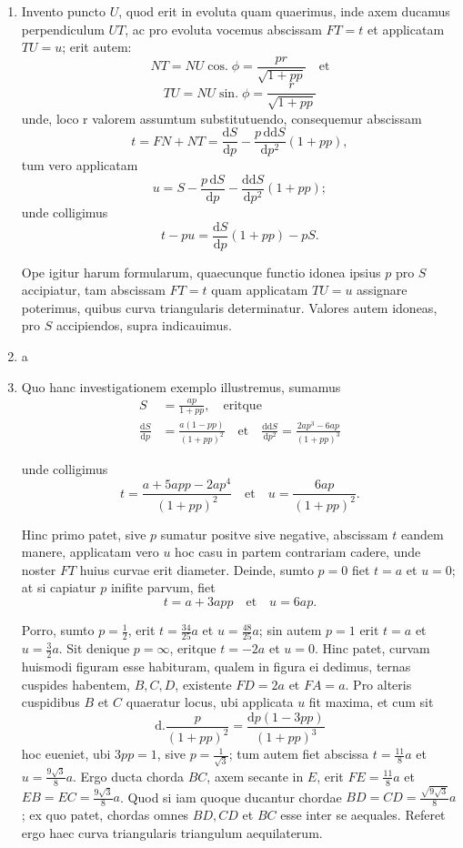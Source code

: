 \documentclass[10pt,a4paper]{article}
\newcommand{\switchenum}{\setcounter{enumi}{\arabic{enumi}-1}\switchcolumn}
\DeclareMathOperator{\sing}{sin.}
\DeclareMathOperator{\cosg}{cos.}
\def\D{\mathrm{d}}
\begin{document}
\begin{paracol}{2}
\begin{enumerate}[topsep=1px]
		\switchcolumn*
		
		\item Invento puncto $U$, quod erit in evoluta quam quaerimus, inde axem ducamus perpendiculum $UT$, ac pro evoluta vocemus abscissam $FT=t$ et applicatam $TU=u$; erit autem:
		\[
			NT = NU \cosg \phi = \frac{pr}{\sqrt{1+pp}} \quad \text{et}
		\]
		\[
			TU = NU \sing \phi = \frac{r}{\sqrt{1+pp}}
		\]
		unde, loco r valorem assumtum substitutuendo, consequemur abscissam
		\[
			t = FN + NT = \frac{\D S}{\D p} - \frac{p\,\D\D S}{\D p^2} (1+pp),
		\]
		tum vero applicatam
		\[
			u = S - \frac{p\, \D S}{\D p}-\frac{\D \D S}{\D p^2}(1+pp);
		\]
		unde colligimus
		\[
			t-pu = \frac{\D S}{\D p}(1+pp)-pS.
		\]
		\par Ope igitur harum formularum, quaecunque functio idonea ipsius $p$ pro $S$ accipiatur, tam abscissam $FT = t$ quam applicatam $TU=u$ assignare poterimus, quibus curva triangularis determinatur. Valores autem idoneas, pro $S$ accipiendos, supra indicauimus.
		
		\switchenum
		\item a
		\switchcolumn*
		
		\item Quo hanc investigationem exemplo illustremus, sumamus
		\begin{align*}
			S &= \frac{ap}{1+pp}, \quad\text{eritque}\\
			\frac{\D S}{\D p} &= \frac{a(1-pp)}{(1+pp)^2} \quad \text{et} \quad \frac{\D \D S}{\D p^2} = \frac{2ap^3-6ap}{(1+pp)^3}
		\end{align*}

		unde colligimus
		\[
			t = \frac{a+5app-2ap^4}{(1+pp)^2}\quad \text{et} \quad u = \frac{6ap}{(1+pp)^2}.
		\]
		\par Hinc primo patet, sive $p$ sumatur positve sive negative, abscissam $t$ eandem manere, applicatam vero $u$ hoc casu in partem contrariam cadere, unde noster $FT$ huius curvae erit diameter. Deinde, sumto $p=0$ fiet $t=a$ et $u=0$; at si capiatur $p$ inifite parvum, fiet
		\[
			t = a + 3app\quad \text{et} \quad u= 6ap.
		\]
		\par Porro, sumto $p=\frac{1}{2}$, erit $t=\frac{34}{25}a$ et $u=\frac{48}{25}a$; sin autem $p=1$ erit $t=a$ et $u=\frac{3}{2}a$. Sit denique $p=\infty$, eritque $t=-2a$ et $u=0$. Hinc patet, curvam huismodi figuram esse habituram, qualem in figura ei dedimus, ternas cuspides habentem, $B,C,D$, existente $FD=2a$ et $FA=a$. Pro alteris cuspidibus $B$ et $C$ quaeratur locus, ubi applicata $u$ fit maxima, et cum sit
		\[
			\D.\frac{p}{(1+pp)^2} = \frac{\D p(1-3pp)}{(1+pp)^3}
		\]
		hoc eueniet, ubi $3pp=1$, sive $p=\frac{1}{\sqrt{3}}$; tum autem fiet abscissa $t=\frac{11}{8}a$ et $u=\frac{9\sqrt{3}}{8}a$. Ergo ducta chorda $BC$, axem secante in $E$, erit $FE= \frac{11}{8}a$ et $EB=EC=\frac{9\sqrt{3}}{8}a$. Quod si iam quoque ducantur chordae $BD=CD = \frac{\sqrt{9\sqrt{3}}}{8}a$; ex quo patet, chordas omnes $BD, CD$ et $BC$ esse inter se aequales. Referet ergo haec curva triangularis triangulum aequilaterum.
		

\end{enumerate}
\end{paracol}
\end{document}
